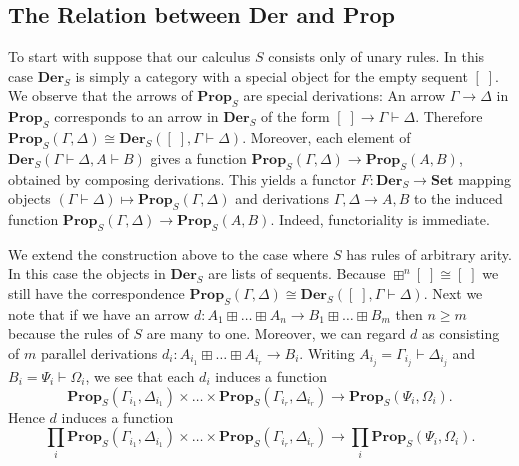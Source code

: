 \documentclass[12pt]{article}
\theoremstyle{definition}
\theoremstyle{plain}
\theoremstyle{plain}
\theoremstyle{plain}
\theoremstyle{plain}
\theoremstyle{remark}
\theoremstyle{remark}
\begin{document}
\subsection{The Relation between Der and Prop}

To start with suppose that our calculus $S$ consists only of unary rules. In this case $\mathbf{Der}_S$ is simply a category with a special object for the empty sequent $[\;]$. We observe that the arrows of $\mathbf{Prop}_S$ are special derivations: An arrow $\Gamma \rightarrow \Delta$ in $\mathbf{Prop}_S$ corresponds to an arrow in $\mathbf{Der}_S$ of the form $[\;] \rightarrow \Gamma \vdash \Delta$. Therefore $\mathbf{Prop}_S(\Gamma,\Delta) \cong \mathbf{Der}_S([\;],\Gamma \vdash \Delta)$. Moreover, each element of $\mathbf{Der}_S(\Gamma \vdash \Delta, A \vdash B)$ gives a function $\mathbf{Prop}_S(\Gamma,\Delta) \rightarrow \mathbf{Prop}_S(A,B)$, obtained by composing derivations. This yields a functor $F: \mathbf{Der}_S \rightarrow \mathbf{Set}$ mapping objects $(\Gamma \vdash \Delta) \mapsto \mathbf{Prop}_S(\Gamma,\Delta)$ and derivations $\Gamma,\Delta \rightarrow A,B$ to the induced function $\mathbf{Prop}_S(\Gamma,\Delta) \rightarrow \mathbf{Prop}_S(A,B)$. Indeed, functoriality is immediate.

We extend the construction above to the case where $S$ has rules of arbitrary arity. In this case the objects in $\mathbf{Der}_S$ are lists of sequents. Because $\boxplus^n [\;] \cong [\;]$ we still have the correspondence $\mathbf{Prop}_S(\Gamma,\Delta) \cong \mathbf{Der}_S([\;],\Gamma \vdash \Delta)$. Next we note that if we have an arrow $d: A_1 \boxplus \ldots \boxplus A_n \rightarrow B_1 \boxplus \ldots \boxplus B_m$ then $n \geq m$ because the rules of $S$ are many to one. Moreover, we can regard $d$ as consisting of $m$ parallel derivations $d_i: A_{i_1} \boxplus \ldots \boxplus A_{i_r} \rightarrow B_i$. Writing $A_{i_j} = \Gamma_{i_j} \vdash \Delta_{i_j}$ and $B_i = \Psi_i \vdash \Omega_i$, we see that each $d_i$ induces a function
$$\mathbf{Prop}_S(\Gamma_{i_1},\Delta_{i_1}) \times \ldots \times  \mathbf{Prop}_S(\Gamma_{i_r},\Delta_{i_r}) \rightarrow \mathbf{Prop}_S(\Psi_i, \Omega_i).$$
Hence $d$ induces a function
$$\prod_i \mathbf{Prop}_S(\Gamma_{i_1},\Delta_{i_1}) \times \ldots \times  \mathbf{Prop}_S(\Gamma_{i_r},\Delta_{i_r}) \rightarrow \prod_i \mathbf{Prop}_S(\Psi_i, \Omega_i).$$
\end{document}
